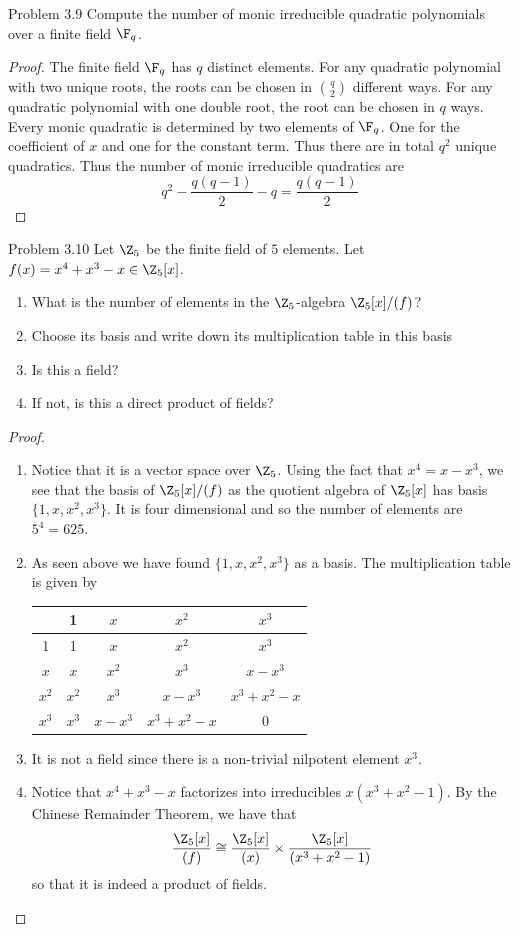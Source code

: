 \documentclass[a4paper]{article}
\begin{document}
\begin{ex}{Problem 3.9}{} Compute the number of monic irreducible quadratic polynomials over a finite field $\F_q$. 
\begin{proof}
The finite field $\F_q$ has $q$ distinct elements. For any quadratic polynomial with two unique roots, the roots can be chosen in $\binom{q}{2}$ different ways. For any quadratic polynomial with one double root, the root can be chosen in $q$ ways. Every monic quadratic is determined by two elements of $\F_q$. One for the coefficient of $x$ and one for the constant term. Thus there are in total $q^2$ unique quadratics. Thus the number of monic irreducible quadratics are $$q^2-\frac{q(q-1)}{2}-q=\frac{q(q-1)}{2}$$
\end{proof}
\end{ex}

\begin{ex}{Problem 3.10}{} Let $\Z_5$ be the finite field of $5$ elements. Let $f(x)=x^4+x^3-x\in\Z_5[x]$. 
\begin{enumerate}
\item What is the number of elements in the $\Z_5$-algebra $\Z_5[x]/(f)$?
\item Choose its basis and write down its multiplication table in this basis
\item Is this a field?
\item If not, is this a direct product of fields?
\end{enumerate} 
\begin{proof}~\\
\begin{enumerate}
\item Notice that it is a vector space over $\Z_5$. Using the fact that $x^4=x-x^3$, we see that the basis of $\Z_5[x]/(f)$ as the quotient algebra of $\Z_5[x]$ has basis $\{1,x,x^2,x^3\}$. It is four dimensional and so the number of elements are $5^4=625$. 
\item As seen above we have found $\{1,x,x^2,x^3\}$ as a basis. The multiplication table is given by 
\begin{center}
\begin{tabular}{c|cccc}
      & 1     & $x$     & $x^2$       & $x^3$       \\ \hline
1     & 1     & $x$     & $x^2$       & $x^3$       \\
$x$   & $x$   & $x^2$   & $x^3$       & $x-x^3$     \\
$x^2$ & $x^2$ & $x^3$   & $x-x^3$     & $x^3+x^2-x$ \\
$x^3$ & $x^3$ & $x-x^3$ & $x^3+x^2-x$ & 0          
\end{tabular}
\end{center}
\item It is not a field since there is a non-trivial nilpotent element $x^3$. 
\item Notice that $x^4+x^3-x$ factorizes into irreducibles $x(x^3+x^2-1)$. By the Chinese Remainder Theorem, we have that $$\frac{\Z_5[x]}{(f)}\cong\frac{\Z_5[x]}{(x)}\times\frac{\Z_5[x]}{(x^3+x^2-1)}$$ so that it is indeed a product of fields. 
\end{enumerate}
\end{proof}
\end{ex}
\end{document}
